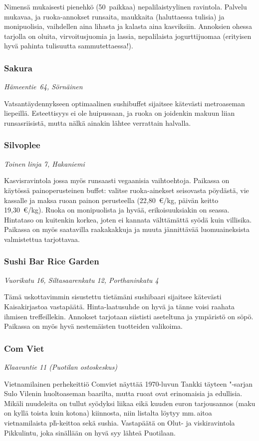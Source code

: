 \documentclass[../ala_hataile.tex]{subfiles}
\begin{document}
Nimensä mukaisesti pienehkö (50~paikkaa)
nepalilaistyylinen ravintola. Palvelu
mukavaa, ja ruoka-annokset runsaita,
maukkaita (haluttaessa tulisia) ja monipuolisia,
vaihdellen aina lihasta ja kalasta aina
kasviksiin. Annoksien ohessa tarjolla on
oluita, virvoitusjuomia ja lassia, nepalilaista
jogurttijuomaa (erityisen hyvä pahinta
tulisuutta sammutettaessa!).
\subsubsection*{Sakura}
\textit{Hämeentie~64, Sörnäinen}

Vatsantäydennykseen optimaalinen
sushibuffet sijaitsee kätevästi metroaseman
liepeillä. Esteettisyys ei ole huipussaan, ja
ruoka on joidenkin makuun liian runsasriisistä,
mutta nälkä ainakin lähtee verrattain
halvalla.
\subsubsection*{Silvoplee}
\textit{Toinen linja 7, Hakaniemi}

Kasvisravintola jossa myös runsaasti
vegaanisia vaihtoehtoja. Paikassa on
käytössä painoperusteinen buffet: valitse
ruoka-ainekset seisovasta pöydästä, vie
kassalle ja maksa ruoan painon perusteella (22,80~\euro/kg, päivän keitto 19,30~\euro/kg).
Ruoka on monipuolista ja hyvää, erikoisuuksiakin
on seassa. Hintataso on kuitenkin
korkea, joten ei kannata välttämättä
syödä kuin villisika. Paikassa on myös saatavilla
raakakakkuja ja muuta jännittävää
luomuaineksista valmistettua tarjottavaa. 
\subsubsection*{Sushi Bar Rice Garden}
\textit{Vuorikatu 16, Siltasaarenkatu 12, Porthaninkatu 4}

Tämä uskottavimmin sisustettu tietämäni
sushibaari sijaitsee kätevästi Kaisakirjastoa
vastapäätä. Hinta-laatusuhde on
hyvä ja tänne voisi raahata ihmisen treffeillekin.
Annokset tarjotaan siististi aseteltuna
ja ympäristö on söpö. Paikassa on myös
hyvä nestemäisten tuotteiden valikoima.

\subsubsection*{Com Viet}
\textit{Klaavuntie 11 (Puotilan ostoskeskus)}

Vietnamilainen perhekeittiö Comviet
näyttää 1970-luvun Tankki täyteen "-sarjan
Sulo Vilenin huoltoaseman baarilta, mutta
ruoat ovat erinomaisia ja edullisia. Mikäli
nuudeleita on tullut syödyksi liikaa eikä
kuuden euron tarjousannos (maku on kyllä
toista kuin kotona) kiinnosta, niin listalta
löytyy mm.\,aitoa vietnamilaista {\selectfont ph\h \ohorn}-keittoa
sekä sushia. Vastapäätä on Olut- ja
viskiravintola Pikkulintu, joka sinällään on
hyvä syy lähteä Puotilaan.
\end{document}
